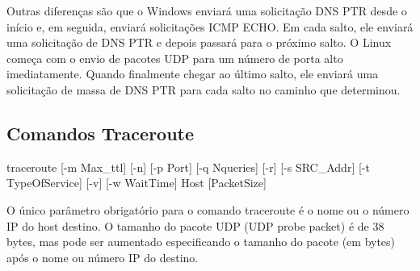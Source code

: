 \documentclass[
	article,			%
	11pt,				%
	oneside,			%
	a4paper,			%
	section=TITLE,		%
	english,			%
	brazil,				%
	sumario=tradicional
	]{abntex2}
\begin{document}
Outras diferenças são que o Windows enviará uma solicitação DNS PTR desde o início e, em seguida, enviará solicitações ICMP ECHO. Em cada salto, ele enviará uma solicitação de DNS PTR e depois passará para o próximo salto. 
O Linux começa com o envio de pacotes UDP para um número de porta alto imediatamente. Quando finalmente chegar ao último salto, ele enviará uma solicitação de massa de DNS PTR para cada salto no caminho que determinou. \cite{Darren}
\subsection{Comandos Traceroute}



traceroute [-m Max\_ttl] [-n] [-p Port] [-q Nqueries] [-r] [-s SRC\_Addr] [-t TypeOfService] [-v] [-w WaitTime] Host [PacketSize]

O único parâmetro obrigatório para o comando traceroute é o nome ou o número IP do host destino. O tamanho do pacote UDP (UDP probe packet) é de 38 bytes, mas pode ser aumentado especificando o tamanho do pacote (em bytes) após o nome ou número IP do destino.
\end{document}
